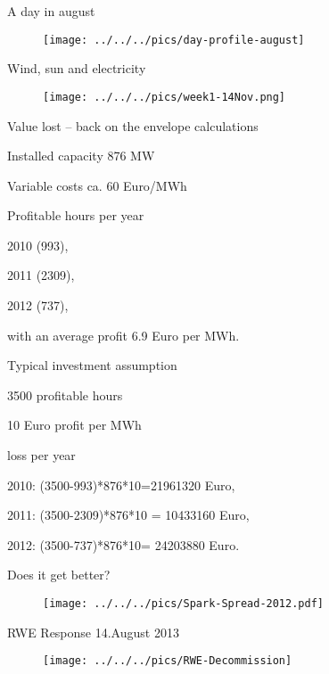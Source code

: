 {A day in august}
\begin{figure}[htp]
\centering
\texttt{[image: ../../../pics/day-profile-august]}
\end{figure}

{Wind, sun and electricity}
\begin{figure}[htp]
\centering
\texttt{[image: ../../../pics/week1-14Nov.png]}
\end{figure}

{Value lost -- back on the envelope calculations}


	Installed capacity 876 MW

	Variable costs ca. 60 Euro/MWh

	Profitable hours per year


	2010 (993),

	2011 (2309),

	2012 (737),


with an average profit 6.9 Euro per MWh.

	Typical investment assumption


	3500 profitable hours

	10 Euro profit per MWh


	loss per year


	2010: (3500-993)*876*10=21961320 Euro,

	2011:  (3500-2309)*876*10 = 10433160 Euro,

	2012: (3500-737)*876*10= 24203880 Euro.




{Does it get better?}
\begin{figure}[htp]
\centering
\texttt{[image: ../../../pics/Spark-Spread-2012.pdf]}
\end{figure}

{RWE Response 14.August 2013}
\begin{figure}[htp]
\centering
\texttt{[image: ../../../pics/RWE-Decommission]}
\end{figure}

